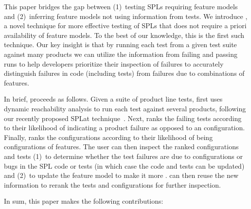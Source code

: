 This paper bridges the gap between (1)~testing SPLs requiring
\complete{} feature models and (2)~inferring feature models not using
information from tests.  We introduce
\emph{\tname}, a novel technique for
more effective testing of SPLs that does not require a priori availability of
\complete{} feature models.  To the best of our knowledge, this is the
first such technique.  Our key insight is that by running each test
from a given test suite against many products we can utilize the
information from failing and passing runs to help developers
prioritize their inspection of failures to accurately distinguish
failures in code (including tests) from failures due to \inconsistent{}
combinations of features.

In brief,
\tname{} proceeds as follows.  Given a suite of product line tests,
\tname{} first uses dynamic reachability analysis to run each test
against several products, following our recently proposed SPLat
technique~\cite{kim-etal-fse2013}.  Next, \tname{} ranks the failing tests
 according to their likelihood of indicating a product
failure as opposed to an \inconsistent{} configuration.  Finally, \tname{} ranks the
configurations according to their likelihood of being \consistent{}
configurations of features.  The user can then inspect the ranked
configurations and tests (1)~to determine whether the test failures
are due to \inconsistent{} configurations or bugs in the SPL code or tests (in
which case the code and tests can be updated) and (2)~to update the
feature model to make it more \complete.  \tname{} can then reuse the
new information to rerank the tests and configurations for further
inspection.

In sum, this paper makes the following contributions:


\newenvironment{Contributions}{}{}
\newcommand{\Contribution}[1]{\vspace{0.5em}\noindent$\bullet$\hspace{0.5em}\textbf{#1:}}

